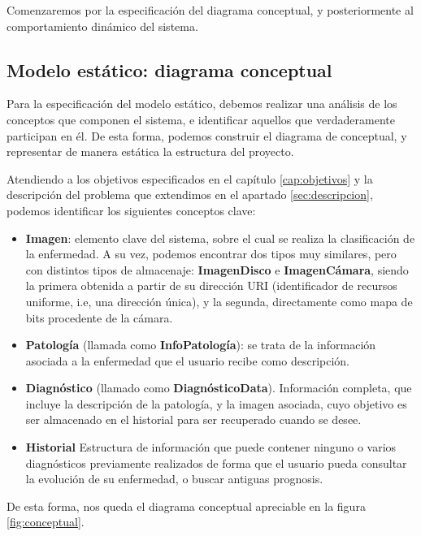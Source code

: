 Comenzaremos por la especificación del diagrama conceptual, y posteriormente al comportamiento dinámico del sistema.

\subsection{Modelo estático: diagrama conceptual}

Para la especificación del modelo estático, debemos realizar una análisis de los conceptos que componen el sistema, e identificar aquellos que verdaderamente participan en él. De esta forma, podemos construir el diagrama de conceptual, y representar de manera estática la estructura del proyecto.

Atendiendo a los objetivos especificados en el capítulo \ref{cap:objetivos} y la descripción del problema que extendimos en el apartado \ref{sec:descripcion}, podemos identificar los siguientes conceptos clave:

\begin{itemize}
	\item \textbf{Imagen}: elemento clave del sistema, sobre el cual se realiza la clasificación de la enfermedad.  A su vez, podemos encontrar dos tipos muy similares, pero con distintos tipos de almacenaje: \textbf{ImagenDisco} e \textbf{ImagenCámara}, siendo la primera obtenida a partir de su dirección URI (identificador de recursos uniforme, i.e, una dirección única), y la segunda, directamente como mapa de bits procedente de la cámara.
	\item  \textbf{Patología} (llamada como \textbf{InfoPatología}): se trata de la información asociada a la enfermedad que el usuario recibe como descripción.
	\item \textbf{Diagnóstico} (llamado como \textbf{DiagnósticoData}). Información completa, que incluye la descripción de la patología, y la imagen asociada, cuyo objetivo es ser almacenado en el historial para ser recuperado cuando se desee.
	\item \textbf{Historial} Estructura de información que puede contener ninguno o varios diagnósticos previamente realizados de forma que el usuario pueda consultar la evolución de su enfermedad, o buscar antiguas prognosis.
\end{itemize}

De esta forma, nos queda el diagrama conceptual apreciable en la figura \ref{fig:conceptual}.

